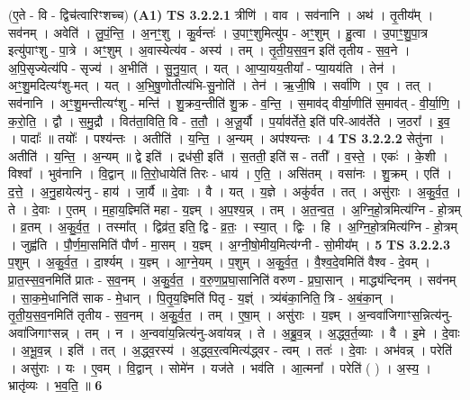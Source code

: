\documentclass[17pt]{extarticle}
\begin{document}
                  \newline
                      (ए॒ते - वि - द्विच॑त्वारिꣳशच्च)  \textbf{(A1)} \newline \newline
                                \textbf{ TS 3.2.2.1} \newline
                  त्रीणि॑ । वाव । सव॑नानि । अथ॑ । तृ॒तीय᳚म् । सव॑नम् । अवेति॑ । लु॒पं॒न्ति॒ । अ॒नꣳ॒॒शु । कु॒र्वन्तः॑ । उ॒पाꣳ॒॒शुमित्यु॑प - अꣳ॒॒शुम् । हु॒त्वा । उ॒पाꣳ॒॒शु॒पा॒त्र इत्यु॑पाꣳशु - पा॒त्रे । अꣳ॒॒शुम् । अ॒वास्येत्य॑व - अस्य॑ । तम् । तृ॒ती॒य॒स॒व॒न इति॑ तृतीय - स॒व॒ने । अ॒पि॒सृज्येत्य॑पि - सृज्य॑ । अ॒भीति॑ । सु॒नु॒या॒त् । यत् । आ॒प्या॒यय॒तीया᳚ - प्या॒यय॑ति । तेन॑ । अꣳ॒॒शु॒मदित्यꣳ॑शु-मत् । यत् । अ॒भि॒षु॒णोतीत्य॑भि-सु॒नोति॑ । तेन॑ । ऋ॒जी॒षि । सर्वा॑णि । ए॒व । तत् । सव॑नानि । अꣳ॒॒शु॒मन्तीत्यꣳ॑शु - मन्ति॑ । शु॒क्रव॒न्तीति॑ शु॒क्र - व॒न्ति॒ । स॒माव॑द् वीर्या॒णीति॑ स॒माव॑त् - वी॒र्या॒णि॒ । क॒रो॒ति॒ । द्वौ । स॒मु॒द्रौ । वित॑ता॒विति॒ वि - त॒तौ॒ । अ॒जू॒र्यौ । प॒र्याव॑र्तेते॒ इति॑ परि-आव॑र्तेते । ज॒ठरा᳚ । इ॒व॒ । पादाः᳚ ॥ तयोः᳚ । पश्य॑न्तः । अतीति॑ । य॒न्ति॒ । अ॒न्यम् । अप॑श्यन्तः । \textbf{  4} \newline
                  \newline
                                \textbf{ TS 3.2.2.2} \newline
                  सेतु॑ना । अतीति॑ । य॒न्ति॒ । अ॒न्यम् ॥ द्वे इति॑ । द्रध॑सी॒ इति॑ । स॒तती॒ इति॑ स - तती᳚ । व॒स्ते॒ । एकः॑ । के॒शी । विश्वा᳚ । भुव॑नानि । वि॒द्वान् ॥ ति॒रो॒धायेति॑ तिरः - धाय॑ । ए॒ति॒ । असि॑तम् । वसा॑नः । शु॒क्रम् । एति॑ । द॒त्ते॒ । अ॒नु॒हायेत्य॑नु - हाय॑ । जा॒र्यै ॥ दे॒वाः । वै । यत् । य॒ज्ञे । अकु॑र्वत । तत् । असु॑राः । अ॒कु॒र्व॒त॒ । ते । दे॒वाः । ए॒तम् । म॒हा॒य॒ज्ञ्मिति॑ महा - य॒ज्ञ्म् । अ॒प॒श्य॒न्न् । तम् । अ॒त॒न्व॒त॒ । अ॒ग्नि॒हो॒त्रमित्य॑ग्नि - हो॒त्रम् । व्र॒तम् । अ॒कु॒र्व॒त॒ । तस्मा᳚त् । द्विव्र॑त॒ इति॒ द्वि - व्र॒तः॒ । स्या॒त् । द्विः । हि । अ॒ग्नि॒हो॒त्रमित्य॑ग्नि - हो॒त्रम् । जुह्व॑ति । पौ॒र्ण॒मा॒समिति॑ पौर्ण - मा॒सम् । य॒ज्ञ्म् । अ॒ग्नी॒षो॒मीय॒मित्य॑ग्नी - सो॒मीय᳚म् । \textbf{  5} \newline
                  \newline
                                \textbf{ TS 3.2.2.3} \newline
                  प॒शुम् । अ॒कु॒र्व॒त॒ । दा॒र्श्यम् । य॒ज्ञ्म् । आ॒ग्ने॒यम् । प॒शुम् । अ॒कु॒र्व॒त॒ । वै॒श्व॒दे॒वमिति॑ वैश्व - दे॒वम् । प्रा॒त॒स्स॒व॒नमिति॑ प्रातः - स॒व॒नम् । अ॒कु॒र्व॒त॒ । व॒रु॒ण॒प्र॒घा॒सानिति॑ वरुण - प्र॒घा॒सान् । माद्ध्य॑न्दिनम् । सव॑नम् । सा॒क॒मे॒धानिति॑ साक - मे॒धान् । पि॒तृ॒य॒ज्ञ्मिति॑ पितृ - य॒ज्ञ्ं । त्र्य॑बंका॒निति॒ त्रि - अ॒बं॒का॒न् । तृ॒ती॒य॒स॒व॒नमिति॑ तृतीय - स॒व॒नम् । अ॒कु॒र्व॒त॒ । तम् । ए॒षा॒म् । असु॑राः । य॒ज्ञ्म् । अ॒न्ववा॑जिगाꣳस॒न्नित्य॑नु-अवा॑जिगाꣳसन्न् । तम् । न । अ॒न्ववा॑य॒न्नित्य॑नु-अवा॑यन्न् । ते । अ॒ब्रु॒व॒न्न् । अ॒द्ध्व॒र्त॒व्याः । वै । इ॒मे । दे॒वाः । अ॒भू॒व॒न्न् । इति॑ । तत् । अ॒द्ध्व॒रस्य॑ । अ॒द्ध्व॒र॒त्वमित्य॑द्ध्वर - त्वम् । ततः॑ । दे॒वाः । अभ॑वन्न् । परेति॑ । असु॑राः । यः । ए॒वम् । वि॒द्वान् । सोमे॑न । यज॑ते । भव॑ति । आ॒त्मना᳚ । परेति॑ ( ) । अ॒स्य॒ । भ्रातृ॑व्यः । भ॒व॒ति॒ ॥ \textbf{  6 } \newline
\end{document}
